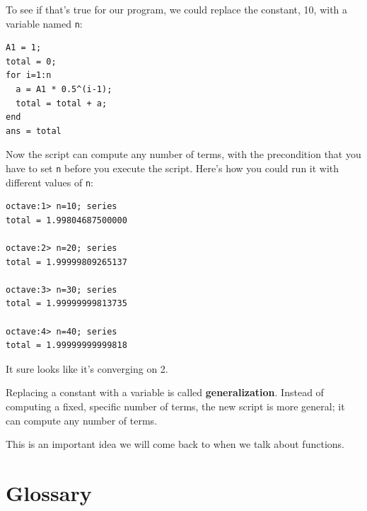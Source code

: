 \documentclass{book}
\begin{document}
To see if that's true for our program, we could replace the
constant, 10, with a variable named {\tt n}:

\begin{verbatim}
A1 = 1;
total = 0;
for i=1:n
  a = A1 * 0.5^(i-1);
  total = total + a;
end
ans = total
\end{verbatim}

Now the script can compute any number of terms, with the
precondition that you have to set {\tt n} before you execute
the script. Here's how you could run it with different values
of {\tt n}:

\begin{verbatim}
octave:1> n=10; series
total = 1.99804687500000

octave:2> n=20; series
total = 1.99999809265137

octave:3> n=30; series
total = 1.99999999813735

octave:4> n=40; series
total = 1.99999999999818
\end{verbatim}

It sure looks like it's converging on 2.

Replacing a constant with a variable is called {\bf generalization}.
Instead of computing a fixed, specific number of terms, the new script
is more general; it can compute any number of terms.

This is an important idea we will come back to when we
talk about functions.


\section{Glossary}
\end{document}
